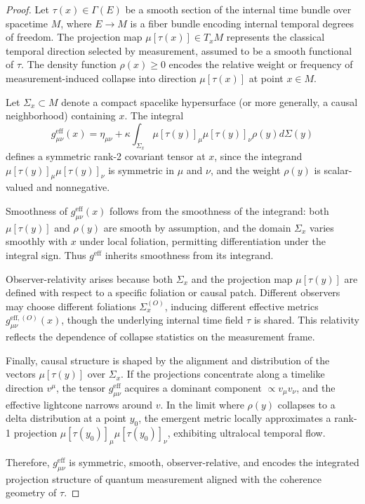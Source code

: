 \documentclass[11pt]{article}
\begin{document}
\begin{proof}
Let \( \tau(x) \in \Gamma(E) \) be a smooth section of the internal time bundle over spacetime \( M \), where \( E \to M \) is a fiber bundle encoding internal temporal degrees of freedom. The projection map \( \mu[\tau(x)] \in T_x M \) represents the classical temporal direction selected by measurement, assumed to be a smooth functional of \( \tau \). The density function \( \rho(x) \geq 0 \) encodes the relative weight or frequency of measurement-induced collapse into direction \( \mu[\tau(x)] \) at point \( x \in M \). 

Let \( \Sigma_x \subset M \) denote a compact spacelike hypersurface (or more generally, a causal neighborhood) containing \( x \). The integral
\[
g^{\text{eff}}_{\mu\nu}(x) = \eta_{\mu\nu} + \kappa \int_{\Sigma_x} \mu[\tau(y)]_\mu \mu[\tau(y)]_\nu \rho(y) d\Sigma(y)
\]
defines a symmetric rank-2 covariant tensor at \( x \), since the integrand \( \mu[\tau(y)]_\mu \mu[\tau(y)]_\nu \) is symmetric in \( \mu \) and \( \nu \), and the weight \( \rho(y) \) is scalar-valued and nonnegative.

Smoothness of \( g^{\text{eff}}_{\mu\nu}(x) \) follows from the smoothness of the integrand: both \( \mu[\tau(y)] \) and \( \rho(y) \) are smooth by assumption, and the domain \( \Sigma_x \) varies smoothly with \( x \) under local foliation, permitting differentiation under the integral sign. Thus \( g^{\text{eff}} \) inherits smoothness from its integrand.

Observer-relativity arises because both \( \Sigma_x \) and the projection map \( \mu[\tau(y)] \) are defined with respect to a specific foliation or causal patch. Different observers may choose different foliations \( \Sigma_x^{(O)} \), inducing different effective metrics \( g^{\text{eff},(O)}_{\mu\nu}(x) \), though the underlying internal time field \( \tau \) is shared. This relativity reflects the dependence of collapse statistics on the measurement frame.

Finally, causal structure is shaped by the alignment and distribution of the vectors \( \mu[\tau(y)] \) over \( \Sigma_x \). If the projections concentrate along a timelike direction \( v^\mu \), the tensor \( g^{\text{eff}}_{\mu\nu} \) acquires a dominant component \( \propto v_\mu v_\nu \), and the effective lightcone narrows around \( v \). In the limit where \( \rho(y) \) collapses to a delta distribution at a point \( y_0 \), the emergent metric locally approximates a rank-1 projection \( \mu[\tau(y_0)]_\mu \mu[\tau(y_0)]_\nu \), exhibiting ultralocal temporal flow.

Therefore, \( g^{\text{eff}}_{\mu\nu} \) is symmetric, smooth, observer-relative, and encodes the integrated projection structure of quantum measurement aligned with the coherence geometry of \( \tau \).
\end{proof}
\end{document}
